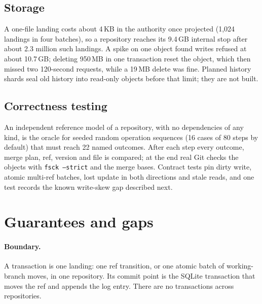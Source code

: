 \documentclass[11pt]{article}
\newcommand{\code}[1]{\texttt{#1}}
\begin{document}
\subsection{Storage}

A one-file landing costs about 4\,KB in the authority once projected (1,024 landings in
four batches), so a repository reaches its 9.4\,GB internal stop after about 2.3 million
such landings. A spike on one object found writes refused at about 10.7\,GB; deleting
950\,MB in one transaction reset the object, which then missed two 120-second requests,
while a 19\,MB delete was fine. Planned history shards seal old history into read-only
objects before that limit; they are not built.

\subsection{Correctness testing}

An independent reference model of a repository, with no dependencies of any kind, is
the oracle for seeded random operation sequences (16 cases of 80 steps by default) that
must reach 22 named outcomes. After each step every outcome, merge plan, ref, version
and file is compared; at the end real Git checks the objects with
\code{fsck --strict} and the merge bases. Contract tests pin dirty write, atomic
multi-ref batches, lost update in both directions and stale reads, and one test records
the known write-skew gap described next.

\section{Guarantees and gaps}
\label{sec:guarantees}

\paragraph{Boundary.} A transaction is one landing: one ref transition, or one atomic
batch of working-branch moves, in one repository. Its commit point is the SQLite
transaction that moves the ref and appends the log entry. There are no transactions
across repositories.
\end{document}
